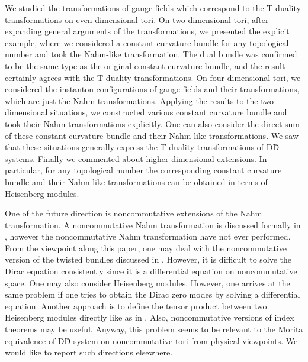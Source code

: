 \documentclass[a4paper,epsf,12pt]{article}
\begin{document}
We studied the transformations of gauge fields which 
correspond to the T-duality transformations 
on even dimensional tori. 
On two-dimensional tori, after expanding general arguments of 
the transformations, 
we presented the explicit example, where 
we considered a constant curvature bundle for any topological 
number and took the Nahm-like transformation. 
The dual bundle was confirmed to be the same type as the original 
constant curvature bundle, and the result certainly agrees with the 
T-duality transformations. 
On four-dimensional tori, we considered the instanton configurations 
of gauge fields and their transformations, which are just the 
Nahm transformations. 
Applying the results to the two-dimensional situations, 
we constructed various constant curvature bundle and took their 
Nahm transformations explicitly. 
One can also consider the direct sum of these constant curvature bundle 
and their Nahm-like transformations. 
We saw that these situations generally express the 
T-duality transformations of D\=D systems. 
Finally we commented about higher dimensional extensions. 
In particular, for any topological number the corresponding 
constant curvature bundle 
and their Nahm-like transformations can be obtained in terms of 
Heisenberg modules.  



One of the future direction is noncommutative extensions of 
the Nahm transformation. 
A noncommutative Nahm transformation is discussed formally 
in \cite{ANS}, however the noncommutative Nahm transformation have not 
ever performed. 
{}From the viewpoint along this paper, 
one may deal with the noncommutative version of the twisted bundles
discussed in \cite{Ho, MoZu}. 
However, it is difficult to solve the Dirac equation consistently 
since it is a differential equation on noncommutative space. 
One may also consider Heisenberg modules. 
However, one arrives at the same problem if 
one tries to obtain the Dirac zero modes by 
solving a differential equation. 
Another approach is to define the tensor product between 
two Heisenberg modules directly like as in \cite{DiSc, Kajiura2}. 
Also, noncommutative versions of index theorems may be useful. 
Anyway, this problem seems to be relevant to the 
Morita equivalence \cite{KoSc} of D\=D system on noncommutative tori
\cite{BKMT,KMT} from physical viewpoints. 
We would like to report such directions elsewhere. 



\vspace{2mm}
\begin{center}
\end{center}
\end{document}
